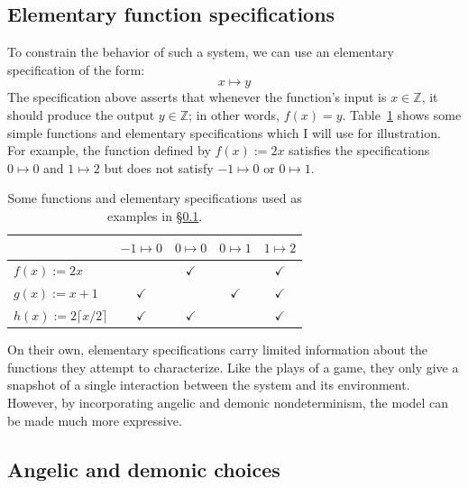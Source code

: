 \documentclass[11pt,oneside,draft]{book}
\theoremstyle{definition}
\begin{document}
\subsection{Elementary function specifications} \label{sec:funspec} %

To constrain the behavior of such a system,
we can use an elementary specification of the form:
\[
  x \mapsto y
\]
The specification above asserts that
whenever the function's input is $x \in \mathbb{Z}$,
it should produce the output $y \in \mathbb{Z}$;
in other words, $f(x) = y$.
Table~\ref{tbl:funspec}
shows some simple functions
and elementary specifications
which I will use for illustration.
For example,
the function defined by $f(x) := 2x$
satisfies the specifications
$0 \mapsto 0$ and $1 \mapsto 2$
but does not satisfy $-1 \mapsto 0$ or $0 \mapsto 1$.

\begin{table}
  \centering
  \begin{tabular}{lcccc}
    \hline &
      $-1 \mapsto 0$ &
      $0 \mapsto 0$ &
      $0 \mapsto 1$ &
      $1 \mapsto 2$ \\
    \hline
      $f(x) := 2x$ & & $\checkmark$ & & $\checkmark$ \\
      $g(x) := x + 1$ & $\checkmark$ & & $\checkmark$ & $\checkmark$ \\
      $h(x) := 2 \lceil x / 2 \rceil$ & $\checkmark$ & $\checkmark$ & & $\checkmark$ \\
    \hline
  \end{tabular}
  \caption{%
    Some functions and elementary specifications
    used as examples in \S\ref{sec:funspec}.}
  \label{tbl:funspec}
\end{table}

On their own,
elementary specifications
carry limited information about the functions
they attempt to characterize.
Like the plays of a game,
they only give a snapshot of a single
interaction between the system and its environment.
However,
by incorporating angelic and demonic nondeterminism,
the model can be made much more expressive.


\subsection{Angelic and demonic choices} %
\end{document}
